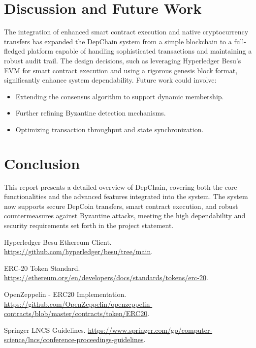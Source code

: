 \documentclass[runningheads]{llncs}
\begin{document}
\section{Discussion and Future Work}
The integration of enhanced smart contract execution and native cryptocurrency transfers has expanded the DepChain system from a simple blockchain to a full-fledged platform capable of handling sophisticated transactions and maintaining a robust audit trail. The design decisions, such as leveraging Hyperledger Besu's EVM for smart contract execution and using a rigorous genesis block format, significantly enhance system dependability. Future work could involve:
\begin{itemize}
    \item Extending the consensus algorithm to support dynamic membership.
    \item Further refining Byzantine detection mechanisms.
    \item Optimizing transaction throughput and state synchronization.
\end{itemize}

\section{Conclusion}
This report presents a detailed overview of DepChain, covering both the core functionalities and the advanced features integrated into the system. The system now supports secure DepCoin transfers, smart contract execution, and robust countermeasures against Byzantine attacks, meeting the high dependability and security requirements set forth in the project statement.


\begin{thebibliography}{4}
Hyperledger Besu Ethereum Client. \url{https://github.com/hyperledger/besu/tree/main}.

ERC-20 Token Standard. \url{https://ethereum.org/en/developers/docs/standards/tokens/erc-20}.

OpenZeppelin - ERC20 Implementation. \url{https://github.com/OpenZeppelin/openzeppelin-contracts/blob/master/contracts/token/ERC20}.

Springer LNCS Guidelines. \url{https://www.springer.com/gp/computer-science/lncs/conference-proceedings-guidelines}.
\end{thebibliography}
\end{document}
